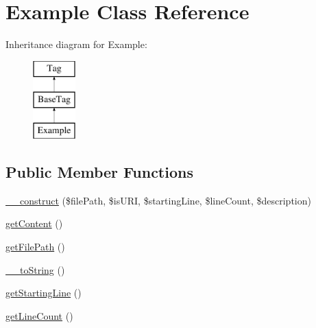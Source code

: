 \hypertarget{classphp_documentor_1_1_reflection_1_1_doc_block_1_1_tags_1_1_example}{}\section{Example Class Reference}
\label{classphp_documentor_1_1_reflection_1_1_doc_block_1_1_tags_1_1_example}
Inheritance diagram for Example\+:\begin{figure}[H]
\begin{center}
\leavevmode
\includegraphics[height=3.000000cm]{classphp_documentor_1_1_reflection_1_1_doc_block_1_1_tags_1_1_example}
\end{center}
\end{figure}
\subsection*{Public Member Functions}
\begin{DoxyCompactItemize}
\item 
\mbox{\hyperlink{classphp_documentor_1_1_reflection_1_1_doc_block_1_1_tags_1_1_example_a0954927c3e2a4fb1c2329b887db4c1f3}{\+\_\+\+\_\+construct}} (\$file\+Path, \$is\+U\+RI, \$starting\+Line, \$line\+Count, \$description)
\item 
\mbox{\hyperlink{classphp_documentor_1_1_reflection_1_1_doc_block_1_1_tags_1_1_example_a58e43f09a06ce4e29b192c4e17ce7915}{get\+Content}} ()
\item 
\mbox{\hyperlink{classphp_documentor_1_1_reflection_1_1_doc_block_1_1_tags_1_1_example_a13f3044501ccff40350fb08dc1a278d6}{get\+File\+Path}} ()
\item 
\mbox{\hyperlink{classphp_documentor_1_1_reflection_1_1_doc_block_1_1_tags_1_1_example_a7516ca30af0db3cdbf9a7739b48ce91d}{\+\_\+\+\_\+to\+String}} ()
\item 
\mbox{\hyperlink{classphp_documentor_1_1_reflection_1_1_doc_block_1_1_tags_1_1_example_a59179ee45a85a9b98184c48a661716cf}{get\+Starting\+Line}} ()
\item 
\mbox{\hyperlink{classphp_documentor_1_1_reflection_1_1_doc_block_1_1_tags_1_1_example_a450c14c12a0570ed4365996d6e5a9ae5}{get\+Line\+Count}} ()
\end{DoxyCompactItemize}
